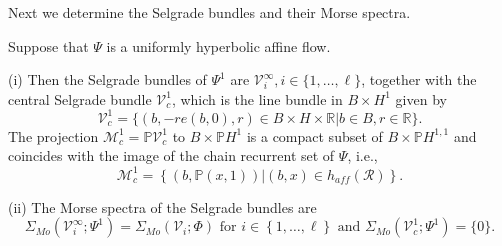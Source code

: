 	Next we determine the Selgrade bundles and their Morse spectra.
	
	\begin{theorem}
		\label{Theorem_hyperbolic2}Suppose that $\Psi$ is a uniformly hyperbolic
		affine flow.
		
		(i) Then the Selgrade bundles of $\Psi^{1}$ are $\mathcal{V}_{i}^{\infty}%
		,i\in\{1,\ldots,\ell\}$, together with the central Selgrade bundle
		$\mathcal{V}_{c}^{1}$, which is the line bundle in $B\times H^{1}$ given by
		\begin{equation}
			\mathcal{V}_{c}^{1}=\{(b,-re(b,0),r)\in B\times H\times\mathbb{R}\left\vert
			b\in B,r\in\mathbb{R}\right.  \}. \label{Vstar2}%
		\end{equation}
		The projection $\mathcal{M}_{c}^{1}=\mathbb{P}\mathcal{V}_{c}^{1}$ to
		$B\times\mathbb{P}H^{1}$ is a compact subset of $B\times\mathbb{P}H^{1,1}$ and
		coincides with the image of the chain recurrent set of $\Psi$, i.e.,%
		\begin{equation}
			\mathcal{M}_{c}^{1}=\left\{  (b,\mathbb{P}(x,1))\left\vert (b,x)\in
			h_{aff}(\mathcal{R})\right.  \right\}  . \label{E_hyp}%
		\end{equation}
		
		
		(ii) The Morse spectra of the Selgrade bundles are%
		\[
		\Sigma_{Mo}(\mathcal{V}_{i}^{\infty};\Psi^{1})=\Sigma_{Mo}(\mathcal{V}%
		_{i};\Phi)\text{ for }i\in\left\{  1,\ldots,\ell\right\}  \text{ and }%
		\Sigma_{Mo}(\mathcal{V}_{c}^{1};\Psi^{1})=\{0\}.
		\]
		
	\end{theorem}
	

